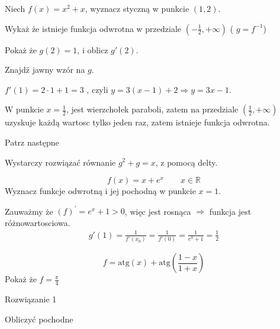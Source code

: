 \documentclass[11pt]{scrartcl}
\begin{document}
    \begin{zadanie}
        \begin{walk}
            \item Niech $f(x) = x^2 + x$, wyznacz styczną w punkcie $\left ( 1, 2 \right )$.
            \item Wykaż że istnieje funkcja odwrotna w przedziale $\left ( -\frac{1}{2}, + \infty  \right )$ ( $g = {f}^{-1} $)
            \item Pokaż że $g \left ( 2 \right ) = 1$, i oblicz $g'(2)$.
            \item Znajdź jawny wzór na $g$.
        \end{walk}
    \end{zadanie}
    
    \begin{walk}
        \item  $f'(1) = 2 \cdot 1 + 1 = 3$ , czyli $y = 3(x-1) + 2 \Rightarrow y = 3x - 1$.
        \item  W punkcie $x = \frac{1}{2}$, jest wierzchołek paraboli, zatem na przedziale $\left ( \frac{1}{2}, +\infty  \right )$ uzyskuje każdą wartosc tylko jeden raz, zatem istnieje funkcja odwrotna.
        \item Patrz następne
        \item Wystarczy rozwiązać równanie $g^2 + g = x$, z pomocą delty.
    \end{walk}
    
    \begin{zadanie}
        \[
            f(x) = x + e^{x} \qquad x \in \mathbb{R} 
        \]
        Wyznacz funkcje odwrotną i jej pochodną w punkcie $x = 1$.
    \end{zadanie}
    
    Zauważmy że $\left ( f \right )^{'} = e^{x} + 1> 0$, więc jest rosnąca $\Rightarrow $ funkcja jest różnowartosciowa. 
    \begin{gather*}
        g'(1) = \frac{1}{f'(x_{0})} = \frac{1}{f'(0)} = \frac{1}{e^{0} + 1} = \frac{1}{2}
    \end{gather*}
    
    \begin{zadanie}
        \[
          f = \text{atg} \left ( x \right ) + \text{atg} \left ( \frac{1-x}{1+x} \right ) 
        \]
      Pokaż że $f = \frac{\pi }{4}$
    \end{zadanie}
    
    Rozwiązanie 1

    Obliczyć pochodne
\end{document}
